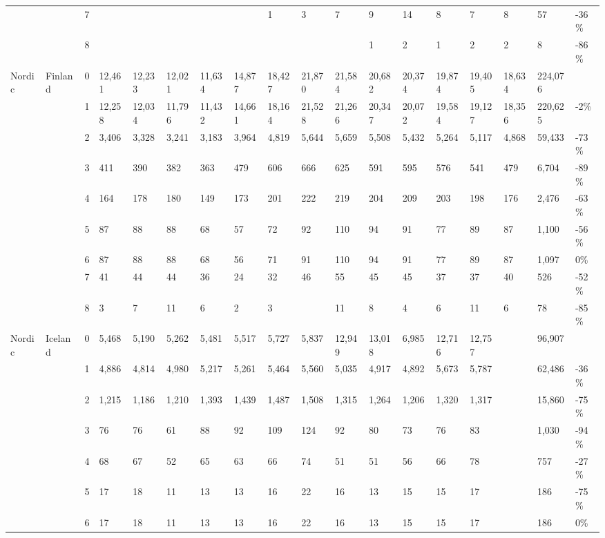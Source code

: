\begin{longtable}{llllllllllllllllll}
   &  & 7 &  &  &  &  &  & 1 & 3 & 7 & 9 & 14 & 8 & 7 & 8 & 57 & -36\% \\ 
   &  & 8 &  &  &  &  &  &  &  &  & 1 & 2 & 1 & 2 & 2 & 8 & -86\% \\ 
  Nordic & Finland & 0 & 12,461 & 12,233 & 12,021 & 11,634 & 14,877 & 18,427 & 21,870 & 21,584 & 20,682 & 20,374 & 19,874 & 19,405 & 18,634 & 224,076 &  \\ 
   &  & 1 & 12,258 & 12,034 & 11,796 & 11,432 & 14,661 & 18,164 & 21,528 & 21,266 & 20,347 & 20,072 & 19,584 & 19,127 & 18,356 & 220,625 & -2\% \\ 
   &  & 2 & 3,406 & 3,328 & 3,241 & 3,183 & 3,964 & 4,819 & 5,644 & 5,659 & 5,508 & 5,432 & 5,264 & 5,117 & 4,868 & 59,433 & -73\% \\ 
   &  & 3 & 411 & 390 & 382 & 363 & 479 & 606 & 666 & 625 & 591 & 595 & 576 & 541 & 479 & 6,704 & -89\% \\ 
   &  & 4 & 164 & 178 & 180 & 149 & 173 & 201 & 222 & 219 & 204 & 209 & 203 & 198 & 176 & 2,476 & -63\% \\ 
   &  & 5 & 87 & 88 & 88 & 68 & 57 & 72 & 92 & 110 & 94 & 91 & 77 & 89 & 87 & 1,100 & -56\% \\ 
   &  & 6 & 87 & 88 & 88 & 68 & 56 & 71 & 91 & 110 & 94 & 91 & 77 & 89 & 87 & 1,097 & 0\% \\ 
   &  & 7 & 41 & 44 & 44 & 36 & 24 & 32 & 46 & 55 & 45 & 45 & 37 & 37 & 40 & 526 & -52\% \\ 
   &  & 8 & 3 & 7 & 11 & 6 & 2 & 3 &  & 11 & 8 & 4 & 6 & 11 & 6 & 78 & -85\% \\ 
  Nordic & Iceland & 0 & 5,468 & 5,190 & 5,262 & 5,481 & 5,517 & 5,727 & 5,837 & 12,949 & 13,018 & 6,985 & 12,716 & 12,757 &  & 96,907 &  \\ 
   &  & 1 & 4,886 & 4,814 & 4,980 & 5,217 & 5,261 & 5,464 & 5,560 & 5,035 & 4,917 & 4,892 & 5,673 & 5,787 &  & 62,486 & -36\% \\ 
   &  & 2 & 1,215 & 1,186 & 1,210 & 1,393 & 1,439 & 1,487 & 1,508 & 1,315 & 1,264 & 1,206 & 1,320 & 1,317 &  & 15,860 & -75\% \\ 
   &  & 3 & 76 & 76 & 61 & 88 & 92 & 109 & 124 & 92 & 80 & 73 & 76 & 83 &  & 1,030 & -94\% \\ 
   &  & 4 & 68 & 67 & 52 & 65 & 63 & 66 & 74 & 51 & 51 & 56 & 66 & 78 &  & 757 & -27\% \\ 
   &  & 5 & 17 & 18 & 11 & 13 & 13 & 16 & 22 & 16 & 13 & 15 & 15 & 17 &  & 186 & -75\% \\ 
   &  & 6 & 17 & 18 & 11 & 13 & 13 & 16 & 22 & 16 & 13 & 15 & 15 & 17 &  & 186 & 0\% \\ 

\end{longtable}
